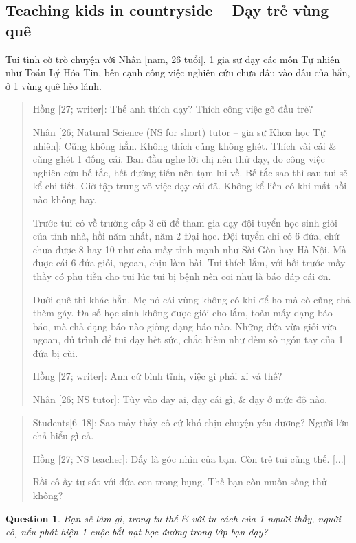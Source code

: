 \documentclass[12pt]{article}
\newtheorem{question}{Question}
\begin{document}
\subsection{Teaching kids in countryside -- Dạy trẻ vùng quê}
Tui tình cờ trò chuyện với Nhân [nam, 26 tuổi], 1 gia sư dạy các môn Tự nhiên như Toán Lý Hóa Tin, bên cạnh công việc nghiên cứu chưa đâu vào đâu của hắn, ở 1 vùng quê hẻo lánh.
\begin{quote}
	{\sf Hồng [27; writer]}: Thế anh thích dạy? Thích công việc gõ đầu trẻ?
	
	{\sf Nhân [26; Natural Science (NS for short) tutor -- gia sư Khoa học Tự nhiên]}: Cũng không hẳn. Không thích cũng không ghét. Thích vài cái \& cũng ghét 1 đống cái. Ban đầu nghe lời chị nên thử dạy, do công việc nghiên cứu bế tắc, hết đường tiến nên tạm lui về. Bế tắc sao thì sau tui sẽ kể chi tiết. Giờ tập trung vô việc dạy cái đã. Không kể liền có khi mất hồi nào không hay.
	
	Trước tui có về trường cấp 3 cũ để tham gia dạy đội tuyển học sinh giỏi của tỉnh nhà, hồi năm nhất, năm 2 Đại học. Đội tuyển chỉ có 6 đứa, chứ chưa được 8 hay 10 như của mấy tỉnh mạnh như Sài Gòn hay Hà Nội. Mà được cái 6 đứa giỏi, ngoan, chịu làm bài. Tui thích lắm, với hồi trước mấy thầy có phụ tiền cho tui lúc tui bị bệnh nên coi như là báo đáp cái ơn.
	
	Dưới quê thì khác hẳn. Mẹ nó cái vùng không có khỉ để ho mà cò cũng chả thèm gáy. Đa số học sinh không được giỏi cho lắm, toàn mấy dạng báo báo, mà chả dạng báo nào giống dạng báo nào. Những đứa vừa giỏi vừa ngoan, đủ trình để tui dạy hết sức, chắc hiếm như đếm số ngón tay của 1 đứa bị cùi.
	
	{\sf Hồng [27; writer]}: Anh cứ bình tĩnh, việc gì phải xỉ vả thế?
	
	{\sf Nhân [26; NS tutor]}: Tùy vào dạy ai, dạy cái gì, \& dạy ở mức độ nào.	
\end{quote}

\begin{quote}
	{\sf Students[6--18]}: Sao mấy thầy cô cứ khó chịu chuyện yêu đương? Người lớn chả hiểu gì cả.
	
	{\sf Hồng [27; NS teacher]}: Đấy là góc nhìn của bạn. Còn trẻ tui cũng thế. [...]
	
	Rồi cô ấy tự sát với đứa con trong bụng. Thế bạn còn muốn sống thử không?
\end{quote}

\begin{question}
	Bạn sẽ làm gì, trong tư thế \& với tư cách của 1 người thầy, người cô, nếu phát hiện 1 cuộc bắt nạt học đường trong lớp bạn dạy?
\end{question}
\end{document}
